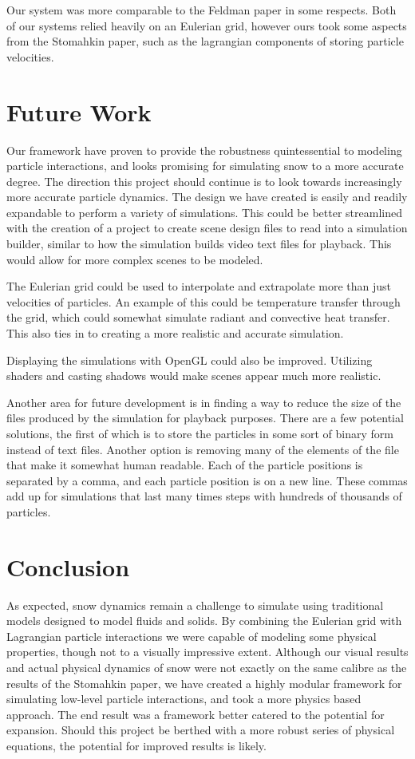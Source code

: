 \documentclass{acm_proc_article-sp}
\begin{document}
Our system was more comparable to the Feldman paper in some respects. Both of our systems relied heavily on an Eulerian grid, however ours took some aspects from the Stomahkin paper, such as the lagrangian components of storing particle velocities.

\section{Future Work}
Our framework have proven to provide the robustness quintessential to modeling particle interactions, and looks promising for simulating snow to a more accurate degree. The direction this project should continue is to look towards increasingly more accurate particle dynamics. The design we have created is easily and readily expandable to perform a variety of simulations. This could be better streamlined with the creation of a project to create scene design files to read into a simulation builder, similar to how the simulation builds video text files for playback. This would allow for more complex scenes to be modeled.

The Eulerian grid could be used to interpolate and extrapolate more than just velocities of particles. An example of this could be temperature transfer through the grid, which could somewhat simulate radiant and convective heat transfer. This also ties in to creating a more realistic and accurate simulation.

Displaying the simulations with OpenGL could also be improved. Utilizing shaders and casting shadows would make scenes appear much more realistic.

Another area for future development is in finding a way to reduce the size of the files produced by the simulation for playback purposes. There are a few potential solutions, the first of which is to store the particles in some sort of binary form instead of text files. Another option is removing many of the elements of the file that make it somewhat human readable. Each of the particle positions is separated by a comma, and each particle position is on a new line. These commas add up for simulations that last many times steps with hundreds of thousands of particles.

\section{Conclusion}
 As expected, snow dynamics remain a challenge to simulate using traditional models designed to model fluids and solids. By combining the Eulerian grid with Lagrangian particle interactions we were capable of modeling some physical properties, though not to a visually impressive extent. Although our visual results and actual physical dynamics of snow were not exactly on the same calibre as the results of the Stomahkin paper, we have created a highly modular framework for simulating low-level particle interactions, and took a more physics based approach. The end result was a framework better catered to the potential for expansion. Should this project be berthed with a more robust series of physical equations, the potential for improved results is likely.
\end{document}
